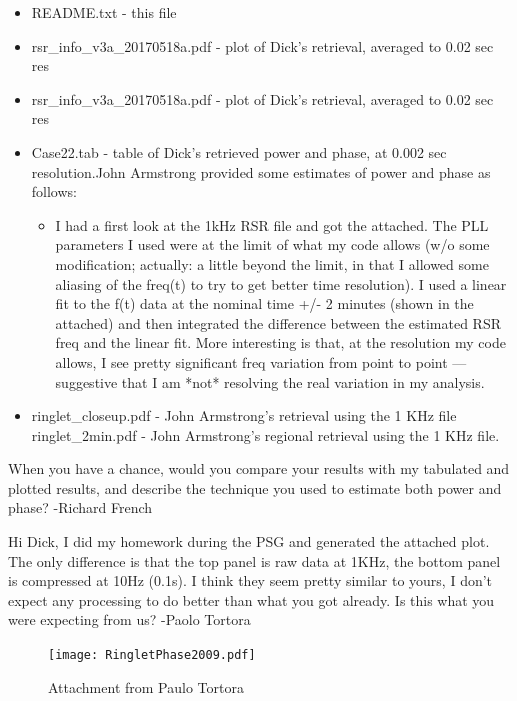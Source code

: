 \documentclass[crop=false,class=book]{standalone}
\begin{document}
\begin{itemize}
    \item README.txt - this file
    \item rsr\_info\_v3a\_20170518a.pdf - plot of Dick's retrieval, averaged to 0.02 sec res
    \item rsr\_info\_v3a\_20170518a.pdf - plot of Dick's retrieval, averaged to 0.02 sec res
    \item Case22.tab - table of Dick's retrieved power and phase, at 0.002 sec resolution.John Armstrong provided some estimates of power and phase as follows:
    \begin{itemize}
        \item I had a first look at the 1kHz RSR file and got the attached. The PLL parameters I used were at the limit of what my code allows (w/o some modification; actually:  a little beyond the limit, in that I allowed
        some aliasing of the freq(t) to try to get better time resolution).  I
        used a linear fit to the f(t) data at the nominal time +/- 2 minutes (shown in the attached) and then integrated the difference between the estimated RSR freq and the linear fit. More interesting is that, at the resolution my code allows, I see pretty significant freq variation from point to point — suggestive that I am *not* resolving the real variation in my analysis.
    \end{itemize}
    \item ringlet\_closeup.pdf - John Armstrong's retrieval using the 1 KHz file ringlet\_2min.pdf - John Armstrong's regional retrieval using the 1 KHz file.
\end{itemize}
When you have a chance, would you compare your results with my tabulated and plotted results, and describe the technique you used to estimate both power and phase? -Richard French\par
Hi Dick, I did my homework during the PSG and generated the attached plot. The only difference is that the top panel is raw data at 1KHz, the bottom panel is compressed at 10Hz (0.1s). I think they seem pretty similar to yours, I don’t expect any processing to do better than what you got already. Is this what you were expecting from us? -Paolo Tortora
\begin{figure}[H]
    \centering
    \texttt{[image: RingletPhase2009.pdf]}
    \caption{Attachment from Paulo Tortora}
\end{figure}
\end{document}

